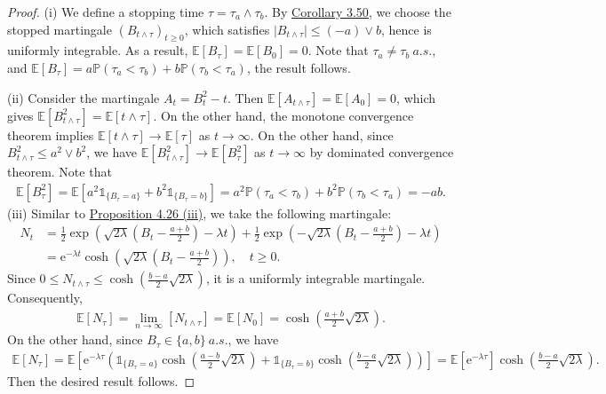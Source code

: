 \documentclass{article}
\numberwithin{equation}{section}
\newcommand{\e}{\mathrm{e}}
\newcommand{\E}{\mathbb{E}}
\renewcommand{\P}{\mathbb{P}}
\theoremstyle{plain}
\theoremstyle{definition}
\begin{document}
\begin{proof}
(i) We define a stopping time $\tau=\tau_a\wedge\tau_b$. By \hyperref[cor:3.50]{Corollary 3.50}, we choose the stopped martingale $(B_{t\wedge\tau})_{t\geq 0}$, which satisfies $\vert B_{t\wedge\tau}\vert\leq (-a)\vee b$, hence is uniformly integrable. As a result, $\E\left[B_\tau\right]=\E\left[B_0\right]=0$. Note that $\tau_a\neq\tau_b\ a.s.$, and $\E[B_\tau]=a\P(\tau_a<\tau_b)+b\P(\tau_b<\tau_a)$, the result follows.\vspace{0.1cm}

(ii) Consider the martingale $A_t=B_t^2-t$. Then $\E[A_{t\wedge\tau}]=\E[A_0]=0$, which gives $\E[B_{t\wedge\tau}^2]=\E[t\wedge\tau]$. On the other hand, the monotone convergence theorem implies $\E[t\wedge\tau]\to\E[\tau]$ as $t\to\infty$.  On the other hand, since $B_{t\wedge\tau}^2 \leq a^2\vee b^2$, we have $\E[B_{t\wedge\tau}^2]\to\E[B_\tau^2]$ as $t\to\infty$ by dominated convergence theorem. Note that
\begin{align*}
	\E\left[B_{\tau}^2\right]=\E\left[a^2\mathds{1}_{\{B_\tau=a\}}+b^2\mathds{1}_{\{B_\tau=b\}}\right] = a^2\P(\tau_a<\tau_b)+b^2\P(\tau_b<\tau_a)=-ab.
\end{align*}
(iii) Similar to \hyperref[prop:4.26]{Proposition 4.26 (iii)}, we take the following martingale:
\begin{align*}
	N_t &= \frac{1}{2}\exp\left(\sqrt{2\lambda}\left(B_t-\frac{a+b}{2}\right)-\lambda t\right)+\frac{1}{2}\exp\left(-\sqrt{2\lambda}\left(B_t-\frac{a+b}{2}\right)-\lambda t\right)\\
	&=\e^{-\lambda t}\cosh\left(\sqrt{2\lambda}\left(B_t-\frac{a+b}{2}\right)\right),\quad t\geq 0.
\end{align*}
Since $0\leq N_{t\wedge\tau}\leq \cosh\left(\frac{b-a}{2}\sqrt{2\lambda}\right)$, it is a uniformly integrable martingale. Consequently,
\begin{align*}
	\E\left[N_\tau\right]=\lim_{n\to\infty}\left[N_{t\wedge\tau}\right]=\E[N_0]=\cosh\left(\frac{a+b}{2}\sqrt{2\lambda}\right).
\end{align*}
On the other hand, since $B_{\tau}\in\{a,b\}\ a.s.$, we have
\begin{align*}
	\E[N_\tau]= \E\left[\e^{-\lambda\tau}\left(\mathds{1}_{\{B_\tau=a\}}\cosh\left(\frac{a-b}{2}\sqrt{2\lambda}\right)+\mathds{1}_{\{B_\tau=b\}}\cosh\left(\frac{b-a}{2}\sqrt{2\lambda}\right)\right)\right]=\E\left[\e^{-\lambda\tau}\right]\cosh\left(\frac{b-a}{2}\sqrt{2\lambda}\right).
\end{align*}
Then the desired result follows.
\end{proof}
\end{document}
